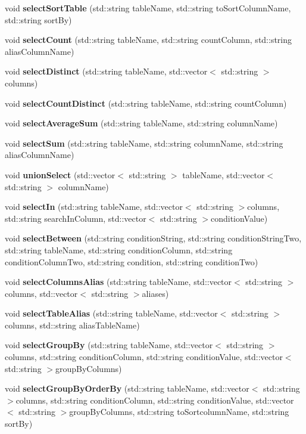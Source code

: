 \begin{DoxyCompactItemize}
\item 
void \textbf{ select\+Sort\+Table} (std\+::string table\+Name, std\+::string to\+Sort\+Column\+Name, std\+::string sort\+By)
\item 
void \textbf{ select\+Count} (std\+::string table\+Name, std\+::string count\+Column, std\+::string alias\+Column\+Name)
\item 
void \textbf{ select\+Distinct} (std\+::string table\+Name, std\+::vector$<$ std\+::string $>$ columns)
\item 
void \textbf{ select\+Count\+Distinct} (std\+::string table\+Name, std\+::string count\+Column)
\item 
void \textbf{ select\+Average\+Sum} (std\+::string table\+Name, std\+::string column\+Name)
\item 
void \textbf{ select\+Sum} (std\+::string table\+Name, std\+::string column\+Name, std\+::string alias\+Column\+Name)
\item 
void \textbf{ union\+Select} (std\+::vector$<$ std\+::string $>$ table\+Name, std\+::vector$<$ std\+::string $>$ column\+Name)
\item 
void \textbf{ select\+In} (std\+::string table\+Name, std\+::vector$<$ std\+::string $>$columns, std\+::string search\+In\+Column, std\+::vector$<$ std\+::string $>$condition\+Value)
\item 
void \textbf{ select\+Between} (std\+::string condition\+String, std\+::string condition\+String\+Two, std\+::string table\+Name, std\+::string condition\+Column, std\+::string condition\+Column\+Two, std\+::string condition, std\+::string condition\+Two)
\item 
void \textbf{ select\+Columns\+Alias} (std\+::string table\+Name, std\+::vector$<$ std\+::string $>$columns, std\+::vector$<$ std\+::string $>$aliases)
\item 
void \textbf{ select\+Table\+Alias} (std\+::string table\+Name, std\+::vector$<$ std\+::string $>$columns, std\+::string alias\+Table\+Name)
\item 
void \textbf{ select\+Group\+By} (std\+::string table\+Name, std\+::vector$<$ std\+::string $>$columns, std\+::string condition\+Column, std\+::string condition\+Value, std\+::vector$<$ std\+::string $>$group\+By\+Columns)
\item 
void \textbf{ select\+Group\+By\+Order\+By} (std\+::string table\+Name, std\+::vector$<$ std\+::string $>$columns, std\+::string condition\+Column, std\+::string condition\+Value, std\+::vector$<$ std\+::string $>$group\+By\+Columns, std\+::string to\+Sortcolumn\+Name, std\+::string sort\+By)

\end{DoxyCompactItemize}
